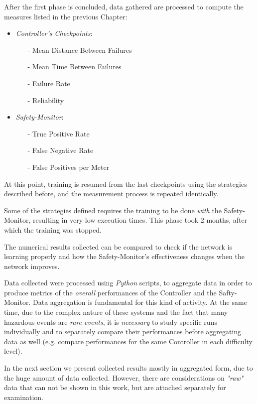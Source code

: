 After the first phase is concluded, data gathered are processed to compute the measures listed in the previous Chapter:

\begin{itemize}
	\item \textsl{Controller's Checkpoints}:
	\begin{itemize}
		\item[-] Mean Distance Between Failures
		\item[-] Mean Time Between Failures
		\item[-] Failure Rate
		\item[-] Reliability
	\end{itemize}
	\item \textsl{Safety-Monitor}:
	\begin{itemize}
		\item[-] True Positive Rate
		\item[-] False Negative Rate
		\item[-] False Positives per Meter
	\end{itemize}
\end{itemize}

At this point, training is resumed from the last checkpoints using the strategies described before, and the measurement process is repeated identically.

Some of the strategies defined requires the training to be done \textsl{with} the Safety-Monitor, resulting in very low execution times. This phase took 2 months, after which the training was stopped.

The numerical results collected can be compared to check if the network is learning properly and how the Safety-Monitor's effectiveness changes when the network improves.

Data collected were processed using \textsl{Python} scripts, to aggregate data in order to produce metrics of the \textsl{overall} performances of the Controller and the Safty-Monitor.
Data aggregation is fundamental for this kind of activity. At the same time, due to the complex nature of these systems and the fact that many hazardous events are \textsl{rare events}, it is \textsl{necessary} to study specific runs individually and to separately compare their performances before aggregating data as well (e.g. compare performances for the same Controller in each difficulty level).

In the next section we present collected results mostly in aggregated form, due to the huge amount of data collected. However, there are considerations on \textsl{"raw"} data that can not be shown in this work, but are attached separately for examination.

